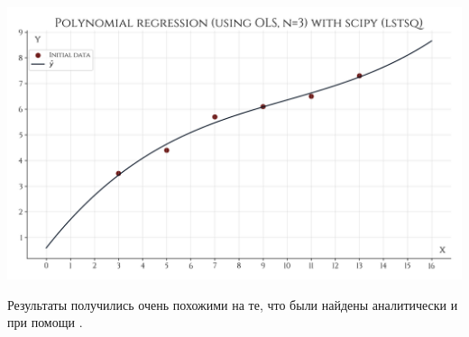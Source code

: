 \documentclass[a4paper, 14pt]{extarticle}
\begin{document}
\begin{center}
    \includegraphics[width=1\textwidth, height=1\textheight, keepaspectratio]{Polynomial_Regression_scipy_lstsq} \\
\end{center}

Результаты получились очень похожими на те, что были найдены аналитически и при помощи .






\end{document}
